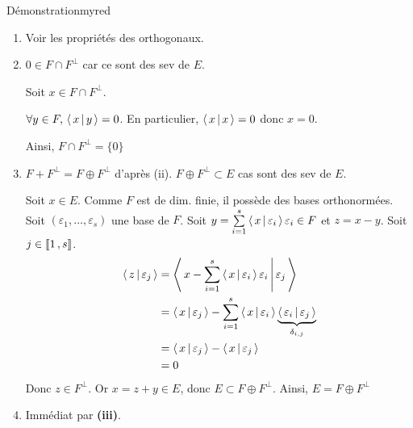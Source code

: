         \begin{demo}{Démonstration}{myred}
            \begin{enumerate}
                \item Voir les propriétés des orthogonaux.
                \item $0 \in F \cap F^{\perp}$ car ce sont des sev de $E$.
                
                Soit $x \in F \cap F^{\perp}$. 
                
                $\forall y \in F, \, \left<\,x\,\middle|\,y\,\right> = 0$. En particulier, $\left<\,x\,\middle|\,x\,\right> =0$ donc $x = 0$.
                
                Ainsi, $F \cap F^{\perp} = \{ 0 \}$
                \item $F + F^{\perp} = F \oplus F^{\perp}$ d’après (ii). $F \oplus F^{\perp} \subset E$ cas sont des sev de $E$.
                
                Soit $x \in E$. Comme $F$ est de dim. finie, il possède des bases orthonormées. Soit $(\varepsilon_1,\ldots,\varepsilon_s)$ une base de $F$. Soit $y = \sum\limits_{i=1}^s \left<\,x\,\middle|\,\varepsilon_i\,\right>\varepsilon_i \in F$ et $z = x-y$. Soit $j \in \left\llbracket 1 \, , s \right\rrbracket$.
                \begin{align*}
                    \left<\,z\,\middle|\,\varepsilon_j\,\right> &= \left<\,x - \sum\limits_{i=1}^s \left<\,x\,\middle|\,\varepsilon_i\,\right>\varepsilon_i\,\middle|\,\varepsilon_j\,\right> \\
                    &= \left<\,x\,\middle|\,\varepsilon_j\,\right> - \sum\limits_{i=1}^s \left<\,x\,\middle|\,\varepsilon_i\,\right> \underbrace{\left<\,\varepsilon_i\,\middle|\,\varepsilon_j\,\right>}_{\delta_{i,j}} \\
                    &= \left<\,x\,\middle|\,\varepsilon_j\,\right> - \left<\,x\,\middle|\,\varepsilon_j\,\right> \\
                    &= 0
                \end{align*}
                Donc $z \in F^{\perp}$. Or $x = z + y \in E$, donc $E \subset F \oplus F^{\perp}$. Ainsi, $E = F \oplus F^{\perp}$
                \item Immédiat par \textbf{(iii)}.
            \end{enumerate}
        \end{demo}

